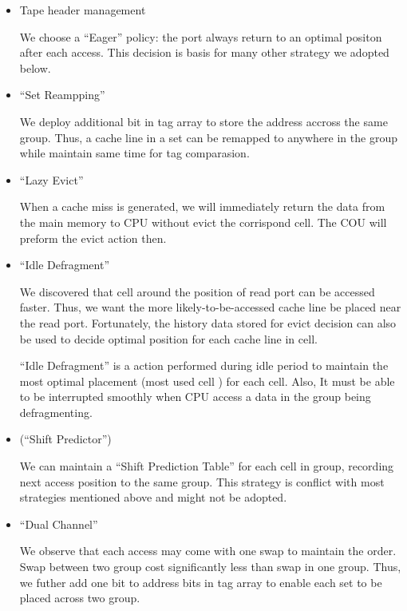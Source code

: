 \documentclass[11pt]{article}
\begin{document}
\begin{itemize}
\item Tape header management

We choose a ``Eager'' policy: the port always return to an optimal positon after each access. This decision is basis for many other strategy we adopted below.

\item ``Set Reampping''

We deploy additional bit in tag array to store the address accross the same group. Thus, a cache line in a set can be remapped to anywhere in the group while maintain same time for tag comparasion.

\item ``Lazy Evict''

When a cache miss is generated, we will immediately return the data from the main memory to CPU without evict the corrispond cell. The COU will preform the evict action then.

\item ``Idle Defragment''

We discovered that cell around the position of read port can be accessed faster. Thus, we want the more likely-to-be-accessed cache line be placed near the read port. Fortunately, the history data stored for evict decision can also be used to decide optimal position for each cache line in cell.

``Idle Defragment'' is a action performed during idle period to maintain the most optimal placement (most used cell ) for each cell. Also, It must be able to be interrupted smoothly when CPU access a data in the group being defragmenting.

\item (``Shift Predictor'')

We can maintain a ``Shift Prediction Table'' for each cell in group, recording next access position to the same group. This strategy is conflict with most strategies mentioned above and might not be adopted.

\item ``Dual Channel''

We observe that each access may come with one swap to maintain the order. Swap between two group cost significantly less than swap in one group. Thus, we futher add one bit to address bits in tag array to enable each set to be placed across two group.

\end{itemize}
\end{document}
